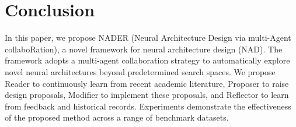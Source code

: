 \section{Conclusion}
In this paper, we propose NADER (Neural Architecture Design via multi-Agent collaboRation), a novel framework for neural architecture design (NAD). The framework adopts a multi-agent collaboration strategy to automatically explore novel neural architectures beyond predetermined search spaces. 
We propose Reader to continuously learn from recent academic literature, Proposer to raise design proposals, Modifier to implement these proposals, and Reflector to learn from feedback and historical records. Experiments demonstrate the effectiveness of the proposed method across a range of benchmark datasets. 

